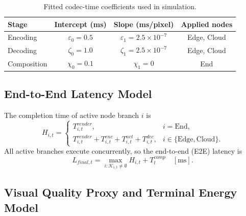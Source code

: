 \documentclass[acmsmall]{acmart}
\begin{document}
	\begin{table}[tbp]
		\centering
		\caption{Fitted codec-time coefficients used in simulation.}
		\label{tab:codec_coefficients}
		\scriptsize
		\setlength{\tabcolsep}{5.0pt}
		\renewcommand{\arraystretch}{1.02}
		\begin{tabular}{lccc}
			\toprule
			\textbf{Stage} & \textbf{Intercept (ms)} &
			\textbf{Slope (ms/pixel)} & \textbf{Applied nodes} \\
			\midrule
			Encoding & $\varepsilon_0=0.5$ & $\varepsilon_1=2.5\times10^{-7}$ & Edge, Cloud \\
			Decoding & $\zeta_0=1.0$ & $\zeta_1=2.5\times10^{-7}$ & Edge, Cloud \\
			Composition & $\chi_0=0.1$ & $\chi_1=0$ & End \\
			\bottomrule
		\end{tabular}
	\end{table}

	\subsection{End-to-End Latency Model}

	The completion time of active node branch $i$ is
	\begin{equation}
		H_{i,t}=
		\begin{cases}
			T^{render}_{i,t}, & i=\mathrm{End},\\
			T^{render}_{i,t}+T^{enc}_{i,t}+T^{net}_{i,t}+T^{dec}_{i,t},
			& i\in\{\mathrm{Edge},\mathrm{Cloud}\}.
		\end{cases}
		\label{eq:branch_latency}
	\end{equation}
	All active branches execute concurrently, so the end-to-end (E2E) latency is
	\begin{equation}
		L_{final,t}=\max_{i:\mathcal{K}_{i,t}\neq\emptyset}H_{i,t}+T^{comp}_{t}
		\quad [\mathrm{ms}].
		\label{eq:e2e_latency}
	\end{equation}
	\subsection{Visual Quality Proxy and Terminal Energy Model}
	\label{sec:quality_energy}
\end{document}
